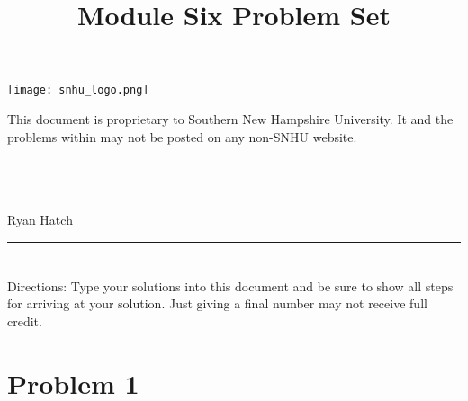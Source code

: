 \documentclass{amsart}
\theoremstyle{definition}
\theoremstyle{Exercise}
\theoremstyle{remark}
\theoremstyle{rule}
\numberwithin{equation}{section}
\begin{document}
\begin{center}
\texttt{[image: snhu\_logo.png]}
\end{center}
\title{\sf Module Six Problem Set}%



\maketitle
This document is proprietary to Southern New Hampshire University. It and the problems within may not be posted on any non-SNHU website.
\\\\\\\\
\begin{center}
Ryan Hatch
\end{center}


\begin{center}
\rule{\textwidth}{0.4pt}
\end{center}
\newpage


\section*{}
\section*{}
Directions: Type your solutions into this document and be sure to show all steps for arriving at your solution. Just giving a final number may not receive full credit.
\\


\section*{Problem 1}
\end{document}

